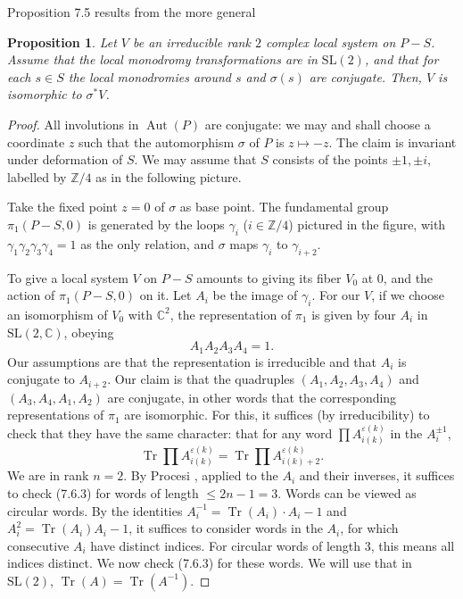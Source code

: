 \documentclass[11pt,a4paper]{article}
\theoremstyle{plain}
\newtheorem{proposition}[theorem]{Proposition}
\theoremstyle{definition}
\DeclareMathOperator{\Aut}{Aut}
\DeclareMathOperator{\Tr}{Tr}
\newcommand{\Z}{\mathbb{Z}}
\newcommand{\C}{\mathbb{C}}
\newcommand{\SL}{\mathrm{SL}}
\begin{document}
Proposition 7.5 results from the more general

\begin{proposition}
Let $V$ be an irreducible rank $2$ complex local system on $P - S$. Assume that the local monodromy transformations are in $\SL(2)$, and that for each $s \in S$ the local monodromies around $s$ and $\sigma(s)$ are conjugate. Then, $V$ is isomorphic to $\sigma^* V$.
\end{proposition}

\begin{proof}
All involutions in $\Aut(P)$ are conjugate: we may and shall choose a coordinate $z$ such that the automorphism $\sigma$ of $P$ is $z \mapsto -z$. The claim is invariant under deformation of $S$. We may assume that $S$ consists of the points $\pm 1, \pm i$, labelled by $\Z/4$ as in the following picture.

Take the fixed point $z = 0$ of $\sigma$ as base point. The fundamental group $\pi_1(P - S, 0)$ is generated by the loops $\gamma_i$ ($i \in \Z/4$) pictured in the figure, with $\gamma_1 \gamma_2 \gamma_3 \gamma_4 = 1$ as the only relation, and $\sigma$ maps $\gamma_i$ to $\gamma_{i+2}$.

To give a local system $V$ on $P - S$ amounts to giving its fiber $V_0$ at $0$, and the action of $\pi_1(P - S, 0)$ on it. Let $A_i$ be the image of $\gamma_i$. For our $V$, if we choose an isomorphism of $V_0$ with $\C^2$, the representation of $\pi_1$ is given by four $A_i$ in $\SL(2, \C)$, obeying
\begin{equation}
A_1 A_2 A_3 A_4 = 1. \tag{7.6.2}
\end{equation}
Our assumptions are that the representation is irreducible and that $A_i$ is conjugate to $A_{i+2}$. Our claim is that the quadruples $(A_1, A_2, A_3, A_4)$ and $(A_3, A_4, A_1, A_2)$ are conjugate, in other words that the corresponding representations of $\pi_1$ are isomorphic. For this, it suffices (by irreducibility) to check that they have the same character: that for any word $\prod A_{i(k)}^{\varepsilon(k)}$ in the $A_i^{\pm 1}$,
\begin{equation}
\Tr \prod A_{i(k)}^{\varepsilon(k)} = \Tr \prod A_{i(k)+2}^{\varepsilon(k)}. \tag{7.6.3}
\end{equation}
We are in rank $n = 2$. By Procesi \cite[Theorem 3.4(a) p. 316]{P}, applied to the $A_i$ and their inverses, it suffices to check (7.6.3) for words of length $\leq 2n - 1 = 3$. Words can be viewed as circular words. By the identities $A_i^{-1} = \Tr(A_i) \cdot A_i - 1$ and $A_i^2 = \Tr(A_i) A_i - 1$, it suffices to consider words in the $A_i$, for which consecutive $A_i$ have distinct indices. For circular words of length $3$, this means all indices distinct. We now check (7.6.3) for these words. We will use that in $\SL(2)$, $\Tr(A) = \Tr(A^{-1})$.


\end{proof}
\end{document}

